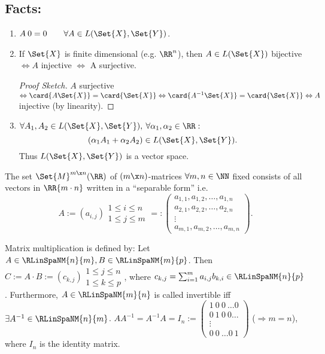 \subsection*{Facts:}
\begin{enumerate}
 \item $A\:0=0\qquad\forall A\in L(\Set{X}, \Set{Y})$. 
 \item If $\Set{X}$ is finite dimensional (e.g. $\RR^n$), then $A\in L(\Set{X})$ bijective $\Leftrightarrow A$ injective $\Leftrightarrow$ A surjective.
 \begin{proof}[Proof Sketch]
  $A$ surjective $\Leftrightarrow \card{A \Set{X}}=\card{\Set{X}}\Leftrightarrow \card{A^{-1} \Set{X}}=\card{\Set{X}}\Leftrightarrow A$ injective (by linearity). 
 \end{proof}
 \item $\forall A_1, A_2\in L(\Set{X},\Set{Y}), \:\forall\alpha_1, \alpha_2\in\RR:$
 $$(\alpha_1 A_1+\alpha_2 A_2)\in L(\Set{X}, \Set{Y}).$$
 Thus $L(\Set{X},\Set{Y})$ is a vector space.
\end{enumerate}
\begin{defn}
 The set $\Set{M}^{m\x n}(\RR)$ of $(m\x n)$-matrices $\forall m,n\in\NN$ fixed consists of all vectors in $\RR{m\cdot n}$ written in a ``separable form'' i.e. $$A:=(a_{i,j})\begin{matrix}1\leq i\leq n\\1\leq j\leq m\end{matrix}=:\left(\begin{matrix}a_{1,1}, a_{1,2},\ldots, a_{1,n}\\a_{2,1}, a_{2,2},\ldots, a_{2,n}\\\vdots\\ a_{m,1}, a_{m,2},\ldots, a_{m,n}\end{matrix}\right).$$
\end{defn}
\begin{defn}
 Matrix multiplication is defined by:
 Let $A\in\RLinSpaNM{n}{m}, B\in\RLinSpaNM{m}{p}$. Then $C:= A\cdot B:=(c_{k,j})\begin{matrix}1\leq j\leq n\\1\leq k\leq p\end{matrix}$, where $c_{k,j}=\sum_{i=1}^{m}a_{i,j}b_{k,i}\in\RLinSpaNM{n}{p}$. Furthermore, $A\in\RLinSpaNM{m}{n}$ is called invertible iff $\exists A^{-1}\in\RLinSpaNM{n}{m}$. $AA^{-1}=A^{-1}A=I_n:=\left(\begin{matrix}1\ 0\ 0\ \ldots 0\\0\ 1\ 0\ 0\ldots\\\vdots\\0\ 0\ \ldots 0\ 1\end{matrix}\right)$ ($\Rightarrow m=n$), where $I_n$ is the identity matrix.
\end{defn}
